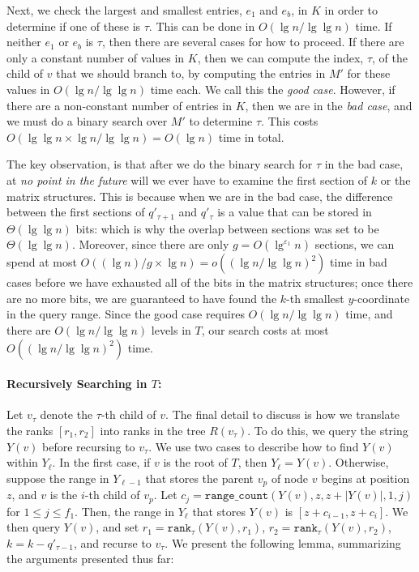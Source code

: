 \documentclass{llncs}
\def\idtt#1{\ensuremath{\mathtt{#1}}}
\def\rankop{\idtt{rank}}
\def\rangecount{\idtt{range\_count}}
\begin{document}
Next, we check the largest and smallest entries, $e_1$ and $e_{b}$, in
$K$ in order to determine if one of these is $\tau$.  This can be done
in $O(\lg n/ \lg \lg n)$ time. If neither $e_1$ or $e_b$ is $\tau$,
then there are several cases for how to proceed.  If there are only a
constant number of values in $K$, then we can compute the index,
$\tau$, of the child of $v$ that we should branch to, by computing the
entries in $M'$ for these values in $O(\lg n/ \lg \lg n)$ time each.
We call this the \emph{good case}.  However, if there are a
non-constant number of entries in $K$, then we are in the \emph{bad
  case}, and we must do a binary search over $M'$ to determine $\tau$.
This costs $O(\lg \lg n \times \lg n / \lg \lg n) = O(\lg n)$ time in
total.

The key observation, is that after we do the binary search for $\tau$
in the bad case, at \emph{no point in the future} will we ever have to
examine the first section of $k$ or the matrix structures.  This is
because when we are in the bad case, the difference between the first
sections of $q'_{\tau+1}$ and $q'_{\tau}$ is a value that can be
stored in $\Theta(\lg \lg n)$ bits: which is why the overlap between
sections was set to be $\Theta(\lg \lg n)$.  Moreover, since there are
only $g = O(\lg^{\varepsilon_1}n)$ sections, we can spend at most
$O((\lg n)/g \times \lg n) = o((\lg n / \lg \lg n)^2)$ time in bad
cases before we have exhausted all of the bits in the matrix
structures; once there are no more bits, we are guaranteed to have
found the $k$-th smallest $y$-coordinate in the query range.  Since
the good case requires $O(\lg n / \lg \lg n)$ time, and there are
$O(\lg n/ \lg \lg n)$ levels in $T$, our search costs at most $O((\lg
n / \lg \lg n)^2)$ time.



\paragraph{Recursively Searching in $T$:} 
Let $v_\tau$ denote the $\tau$-th child of $v$.  The final detail to
discuss is how we translate the ranks $[r_1,r_2]$ into ranks in the
tree $R(v_\tau)$.  To do this, we query the string $Y(v)$ before
recursing to $v_\tau$.  We use two cases to describe how to find
$Y(v)$ within $Y_\ell$. In the first case, if $v$ is the root of $T$,
then $Y_\ell = Y(v)$.  Otherwise, suppose the range in $Y_{\ell - 1}$
that stores the parent $v_p$ of node $v$ begins at position $z$, and
$v$ is the $i$-th child of $v_p$.  Let $c_{j} = \rangecount(Y(v), z,
z+|Y(v)|,1,j)$ for $1 \le j \le f_1$. Then, the range in $Y_\ell$ that
stores $Y(v)$ is $[z + c_{i-1}, z + c_{i}]$. We then query $Y(v)$, and
set $r_1 = \rankop_\tau(Y(v),r_1)$, $r_2 = \rankop_\tau(Y(v),r_2)$, $k
= k - q'_{\tau-1}$, and recurse to $v_\tau$.  We present the following
lemma, summarizing the arguments presented thus far:
\end{document}
